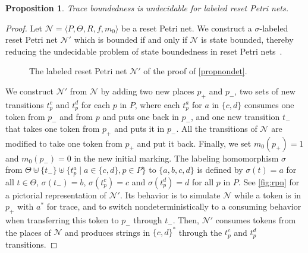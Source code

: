 \documentclass[11pt,reqno,a4paper]{amsart}
\newcommand{\tup}[1]{\langle #1\rangle}
\renewcommand{\cite}{\citep}
\theoremstyle{plain}
\newtheorem{proposition}[theorem]{Proposition}
\theoremstyle{definition}
\theoremstyle{remark}
\begin{document}
\begin{proposition}\label{propnondet}
  Trace boundedness is undecidable for labeled reset Petri nets.
\end{proposition}
\begin{proof}
  Let $\mathcal{N}=\tup{P,\Theta,R,f,m_0}$ be a reset Petri net.  We
  construct a $\sigma$-labeled reset Petri net $\mathcal{N}'$ which is
  bounded if and only if $\mathcal{N}$ is state bounded, thereby
  reducing the undecidable problem of state boundedness in reset Petri
  nets~\cite{boundedRPN}.

\begin{figure}[bt]
\centering
{}
\caption{\label{fig:rpn}The labeled reset Petri net $\mathcal{N}'$ of the proof
of \autoref{propnondet}.}
\end{figure}
  We construct $\mathcal{N}'$ from $\mathcal{N}$ by adding two new
  places $p_+$ and $p_-$, two sets of new transitions $t^c_p$ and
  $t^d_p$ for each $p$ in $P$, where each $t^a_p$ for $a$ in $\{c,d\}$
  consumes one token from $p_-$ and from $p$ and puts one back in $p_-$,
  and one new transition $t_-$ that takes one token from $p_+$ and puts
  it in $p_-$.  All the transitions of $\mathcal{N}$ are modified to
  take one token from $p_+$ and put it back.  Finally, we set
  $m_0(p_+)=1$ and $m_0(p_-)=0$ in the new initial marking.  The
  labeling homomorphism $\sigma$ from
  $\Theta\uplus\{t_-\}\uplus\{t^a_p\mid a\in\{c,d\},p\in P\}$ to
  $\{a,b,c,d\}$ is defined by $\sigma(t)=a$ for all
  $t\in\Theta$, $\sigma(t_-)=b$, $\sigma(t^c_p)=c$ and $\sigma(t^d_p)=d$ for
  all $p$ in $P$.  See \autoref{fig:rpn} for a pictorial representation
  of $\mathcal{N}'$.  Its behavior is to simulate $\mathcal{N}$ while a
  token is in $p_+$ with $a^\ast$ for trace, and to switch
  nondeterministically to a consuming behavior when transferring this
  token to $p_-$ through $t_-$.  Then, $\mathcal{N}'$ consumes tokens
  from the places of $\mathcal{N}$ and produces strings in
  $\{c,d\}^\ast$ through the $t^c_p$ and $t^d_p$ transitions.


\end{proof}
\end{document}
